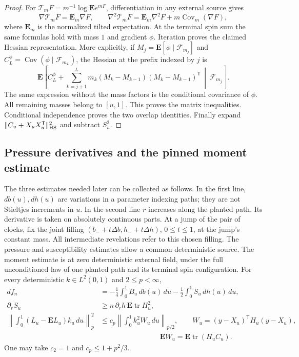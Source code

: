 \begin{proof}
For $\mathcal T_m F=m^{-1}\log\mathbf E e^{mF}$, differentiation in any
external source gives
\[
 \nabla\mathcal T_mF=\mathbf E_m\nabla F,\qquad
 \nabla^2\mathcal T_mF=\mathbf E_m\nabla^2F
                  +m\operatorname{Cov}_m(\nabla F),
\]
where $\mathbf E_m$ is the normalized tilted expectation. At the
terminal spin sum the same formulas hold with mass $1$ and gradient
$\phi$. Iteration proves the claimed Hessian representation. More
explicitly, if $M_j=\mathbf E[\phi\mid\mathcal F_{m_j}]$ and
$C_L^\phi=\operatorname{Cov}(\phi\mid\mathcal F_{m_L})$, the Hessian at
the prefix indexed by $j$ is
\[
 \mathbf E\left[C_L^\phi+
   \sum_{k=j+1}^L m_k(M_k-M_{k-1})(M_k-M_{k-1})^{\mathsf T}
           \,\middle|\,\mathcal F_{m_j}\right].
\]
The same expression without the mass factors is the conditional
covariance of $\phi$. All remaining masses belong to $[u,1]$.
This proves the matrix inequalities. Conditional independence proves the
two overlap identities. Finally expand
$\|C_u+X_uX_u^{\mathsf T}\|_{\rm HS}^2$ and subtract $S_u^2$.
\end{proof}

\subsection{Pressure derivatives and the pinned moment estimate}

The three estimates needed later can be collected as follows. In the
first line, $db(u),dh(u)$ are variations in a parameter indexing paths;
they are not Stieltjes increments in $u$. In the second line $r$ increases
along the planted path. Its derivative is taken on absolutely continuous
parts. At a jump of the pair of clocks, fix the joint filling
$(b_-+t\Delta b,h_-+t\Delta h)$, $0\le t\le1$, at the jump's constant
mass. All intermediate revelations refer to this chosen filling.
The pressure and susceptibility estimates allow a common deterministic
source. The moment estimate is at zero deterministic external field,
under the full unconditioned law of one planted path and its terminal
spin configuration.
For every deterministic $k\in L^2(0,1)$ and $2\leq p<\infty$,
\begin{equation}
\begin{split}
 df_n&=-\tfrac14\int_0^1B_u\,db(u)\,du
       -\tfrac12\int_0^1S_u\,dh(u)\,du,\\
 \partial_rS_u&\geq n\,\partial_rh\,
                  \mathbf E\operatorname{tr}H_u^2,\\
 \left\|\int_0^1(L_u-\mathbf EL_u)k_u\,du\right\|_p^2
     &\leq c_p\left\|\int_0^1 k_u^2W_u\,du\right\|_{p/2},
 \qquad W_u=(y-X_u)^{\mathsf T}H_u(y-X_u),\\[-2pt]
 &\hspace{100pt}\mathbf EW_u=\mathbf E\operatorname{tr}(H_uC_u).
\end{split}\tag{1}\label{eq:1}
\end{equation}
One may take $c_2=1$ and $c_p\leq1+p^2/3$.

